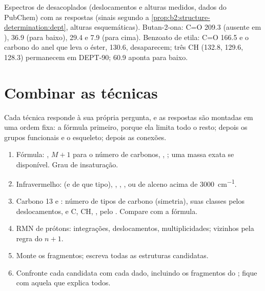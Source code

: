 \begin{omfigure}
{\small Espectros de  desacoplados (deslocamentos e alturas medidos, dados do PubChem) com as
respostas  (sinais segundo a \cref{prop:b2:structure-determination:dept}, alturas esquemáticas).
Butan-2-ona: C=O 209.3 (ausente em ),  36.9 (para baixo),  29.4 e 7.9 (para cima).
Benzoato de etila: C=O 166.5 e o carbono do anel que leva o éster, 130.6, desaparecem; três CH 
(132.8, 129.6, 128.3) permanecem em DEPT-90;  60.9 aponta para baixo.}
\end{omfigure}

\section{Combinar as técnicas}

Cada técnica responde à sua própria pergunta, e as respostas são montadas em uma ordem fixa: a fórmula
primeiro, porque ela limita todo o resto; depois os grupos funcionais e o esqueleto; depois as
conexões.

\begin{method}\label{met:b2:structure-determination:solve}
\begin{enumerate}
  \item Fórmula: , $M+1$ para o número de carbonos, , ;
        uma massa exata se disponível. Grau de insaturação.
  \item Infravermelho:  (e de que tipo), , , ,   ou de
        alceno acima de \qty{3000}{cm^{-1}}.
  \item Carbono 13 e : número de tipos de carbono (simetria), suas classes pelos deslocamentos, e
        C, CH, ,  pelo . Compare com a fórmula.
  \item RMN de prótons: integrações, deslocamentos, multiplicidades; vizinhos pela regra do $n + 1$.
  \item Monte os fragmentos; escreva todas as estruturas candidatas.
  \item Confronte cada candidata com cada dado, incluindo os fragmentos do ; fique com
        aquela que explica todos.
\end{enumerate}
\end{method}

